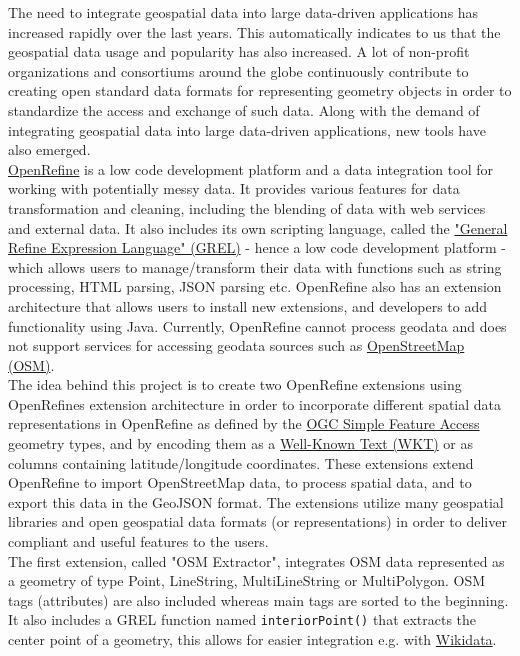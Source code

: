 The need to integrate geospatial data into large data-driven applications has increased
rapidly over the last years. This automatically indicates to us that the geospatial data usage and popularity has also increased. A lot of non-profit organizations and consortiums around the globe continuously contribute to creating open standard data formats for representing geometry objects in order to standardize the access and exchange of such data. Along with the demand of integrating geospatial data into large data-driven applications, new tools have also emerged.\\
\newline
\href{https://openrefine.org/}{OpenRefine} is a low code development platform and a data integration tool for working with potentially messy data.
It provides various features for data transformation and cleaning, including the blending of data with web services and external data. It also includes its own scripting language, called the \href{https://docs.openrefine.org/manual/grel}{"General Refine Expression Language" (GREL)} - hence a low code development platform - which allows users to manage/transform their data with functions such as string processing, HTML parsing, JSON parsing etc. OpenRefine also has an extension architecture that allows users to install new extensions, and developers to add functionality using Java. Currently, OpenRefine cannot process geodata and does not support services for accessing geodata sources such as \href{https://www.openstreetmap.org/}{OpenStreetMap (OSM)}. \\
\newline
The idea behind this project is to create two OpenRefine extensions using OpenRefine\textquotesingle s extension architecture in order to incorporate
different spatial data representations in OpenRefine as defined by the \href{https://www.ogc.org/standards/sfa}{OGC Simple Feature Access} geometry types, and by encoding them as a \href{https://www.ogc.org/standards/wkt-crs}{Well-Known Text (WKT)} or as columns containing latitude/longitude coordinates. These extensions extend OpenRefine to import OpenStreetMap data, to process spatial data, and to export this data in the GeoJSON format. The extensions utilize many geospatial libraries and open geospatial data formats (or representations) in order to deliver compliant and useful features to the users.\\
\newline
The first extension, called "OSM Extractor", integrates OSM data represented as a geometry of type Point, LineString, MultiLineString or MultiPolygon. OSM tags (attributes) are also included whereas main tags are sorted to the beginning. It also includes a GREL function named \texttt{interiorPoint()} that extracts the center point of a geometry, this allows for easier integration e.g. with \href{https://www.wikidata.org/wiki/Wikidata:Main_Page}{Wikidata}.\\
